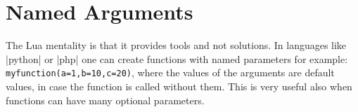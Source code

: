 \section{Named Arguments}

The Lua mentality is that it provides tools and not solutions. In languages like |python| or |php| one can create functions with named parameters for example: \texttt{myfunction(a=1,b=10,c=20)}, where the values of the arguments are default values, in case the function is called without them. This is very useful also when functions can have many optional parameters.








